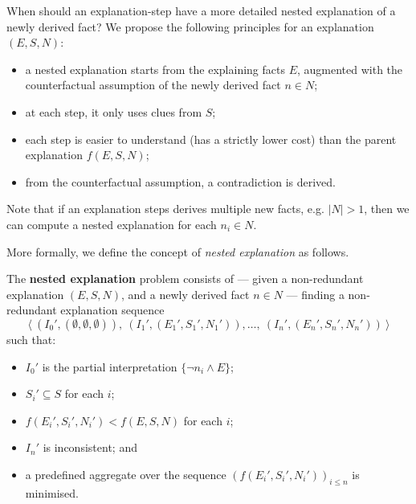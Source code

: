 
When should an explanation-step have a more detailed nested explanation of a newly derived fact? We propose the following principles for an explanation $(E,S,N)$:
\begin{itemize}
 \item a nested explanation starts from the explaining facts $E$, %
 augmented with the counterfactual assumption of the newly derived fact $n \in N$; 
 \item at each step, it only uses clues from $S$;
 \item each step is easier to understand (has a strictly lower cost) than the parent explanation $f(E,S,N)$;
 \item from the counterfactual assumption, a contradiction is derived. %
\end{itemize}

Note that if an explanation steps derives multiple new facts, e.g. $|N| > 1$, then we can compute a nested explanation for each $n_i \in N$.

More formally, we define the concept of \emph{nested explanation} as follows. 

\begin{definition}\label{def:nested-problem}
The \textbf{nested explanation} problem consists of --- given a non-redundant explanation $(E, S, N)$, and a newly derived fact $n \in N$ --- finding a non-redundant explanation sequence 
    \[\langle \ (I_0',(\emptyset,\emptyset,\emptyset)),\ (I_1',(E_1',S_1',N_1')), \dots ,\ (I_n',(E_n',S_n',N_n')) \ \rangle\]
    such that:
    \begin{itemize}
        \item $I_0'$ is the partial interpretation $\{ \neg n_i \wedge E \}$;
        \item $S_i'\subseteq S$ for each $i$;
        \item $f(E_i',S_i',N_i')< f(E, S, N)$ for each $i$; 
        \item $I_n'$ is inconsistent; and
        \item a predefined aggregate over the sequence $\left(f(E_i',S_i',N_i')\right)_{i\leq n}$ is minimised.
    \end{itemize}
\end{definition}


